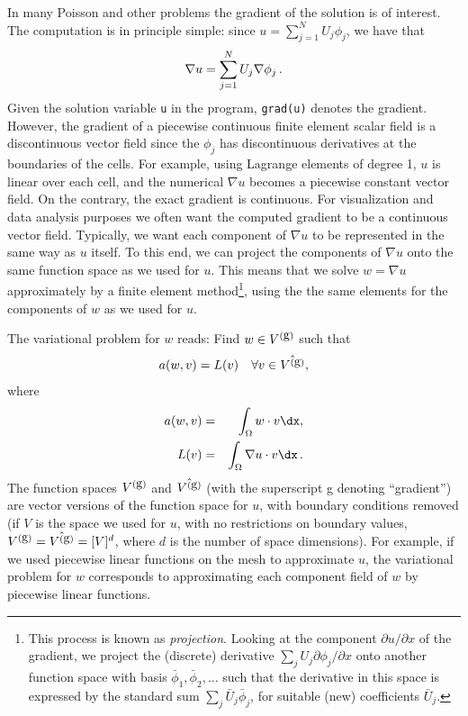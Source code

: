 In many Poisson and other problems the gradient of the solution is
of interest. The computation is in principle simple:
since
$u = \sum_{j=1}^N U_j \phi_j$, we have that
\[ \nabla u = \sum_{j=1}^N U_j \nabla \phi_j\thinspace .\]
Given the solution variable {\fontsize{10pt}{10pt}\texttt{u}} in the program, {\fontsize{10pt}{10pt}\texttt{grad(u)}} denotes
the gradient. However, the gradient of a piecewise continuous
finite element scalar field
is a discontinuous vector field
since the $\phi_j$ has discontinuous derivatives at the boundaries of
the cells. For example, using Lagrange elements of degree 1, $u$ is
linear over each cell, and the numerical $\nabla u$ becomes a piecewise
constant vector field. On the contrary,
the exact gradient is continuous.
For visualization and data analysis purposes
we often want the computed
gradient to be a continuous vector field. Typically,
we want each component of $\nabla u$ to be represented in the same
way as $u$ itself. To this end, we can project the components
of $\nabla u$ onto the
same function space as we used for $u$.
This means that we solve $w = \nabla u$ approximately by a finite element 
method\footnote{This process is known as \emph{projection}.
Looking at the component $\partial u/\partial x$ of the gradient, we project
the (discrete) derivative
$\sum_jU_j{\partial \phi_j/\partial x}$ onto another function space
with basis $\bar\phi_1,\bar\phi_2,\ldots$ such that the derivative in
this space is expressed by the standard sum 
$\sum_j\bar U_j\bar \phi_j$, for suitable (new) 
coefficients $\bar U_j$.},
using the the same elements for the components of $w$ as we used for $u$.

The variational problem for $w$ reads: Find  $w\in V^{(\mbox{g})}$ such that
\begin{equation}
a(w, v) = L(v)\quad\forall v\in \hat{V^{(\mbox{g})}},
\end{equation}
where
\begin{eqnarray}
a(w, v) &=& \int_\Omega w\cdot v\dx,\\
L(v) &=& \int_\Omega \nabla u\cdot v\dx\langtangenep
\end{eqnarray}
The function spaces $V^{(\mbox{g})}$ and $\hat{V^{(\mbox{g})}}$ (with the superscript
g denoting ``gradient'') are
vector versions of the function space for $u$, with
boundary conditions removed (if $V$ is the 
space we used for $u$, with no restrictions
on boundary values, $ V^{(\mbox{g})} = \hat{V^{(\mbox{g})}} = [V]^d$, where
$d$ is the number of space dimensions).
For example, if we used piecewise linear functions on the mesh to
approximate $u$, the variational problem for $w$ corresponds to
approximating each component field of $w$ by piecewise linear functions.

